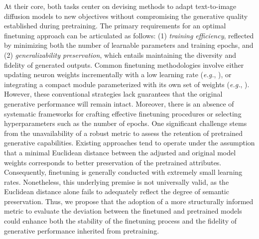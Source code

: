 At their core, both tasks center on devising methods to adapt text-to-image diffusion models to new objectives without compromising the generative quality established during pretraining. The primary requirements for an optimal finetuning approach can be articulated as follows: (1) \emph{training efficiency}, reflected by minimizing both the number of learnable parameters and training epochs, and (2) \emph{generalizability preservation}, which entails maintaining the diversity and fidelity of generated outputs. Common finetuning methodologies involve either updating neuron weights incrementally with a low learning rate (\emph{e.g.}, \cite{ruiz2023dreambooth}), or integrating a compact module parameterized with its own set of weights (\emph{e.g.}, \cite{hulora2022,zhang2023adding}). However, these conventional strategies lack guarantees that the original generative performance will remain intact. Moreover, there is an absence of systematic frameworks for crafting effective finetuning procedures or selecting hyperparameters such as the number of epochs. One significant challenge stems from the unavailability of a robust metric to assess the retention of pretrained generative capabilities. Existing approaches tend to operate under the assumption that a minimal Euclidean distance between the adjusted and original model weights corresponds to better preservation of the pretrained attributes. Consequently, finetuning is generally conducted with extremely small learning rates. Nonetheless, this underlying premise is not universally valid, as the Euclidean distance alone fails to adequately reflect the degree of semantic preservation. Thus, we propose that the adoption of a more structurally informed metric to evaluate the deviation between the finetuned and pretrained models could enhance both the stability of the finetuning process and the fidelity of generative performance inherited from pretraining.

